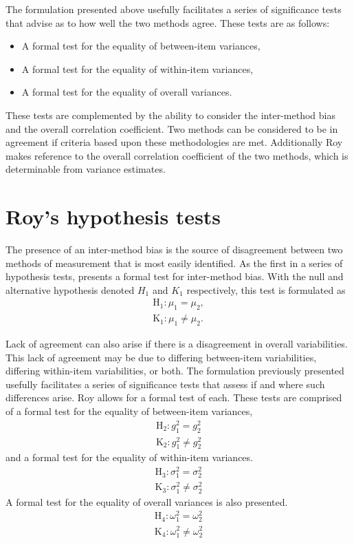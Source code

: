 \documentclass[12pt, a4paper]{report}
\theoremstyle{plain}
\theoremstyle{definition}
\theoremstyle{remark}
\begin{document}
	
The formulation presented above usefully facilitates a series of
significance tests that advise as to how well the two methods
agree. These tests are as follows:
\begin{itemize}
	\item A formal test for the equality of between-item variances,
	\item A formal test for the equality of within-item variances,
	\item A formal test for the equality of overall variances.
\end{itemize}
These tests are complemented by the ability to consider the inter-method bias and the overall correlation coefficient. Two methods can be considered to be in agreement if criteria based upon these methodologies are met. Additionally Roy makes reference to the overall correlation coefficient of the two methods, which is determinable from variance estimates.

\section{Roy's hypothesis tests}
The presence of an inter-method bias is the source of disagreement between two methods of measurement that is most easily identified. As the first in a series of hypothesis tests, \citet{roy} presents a formal test for inter-method bias. With the null and alternative hypothesis denoted $H_1$ and $K_1$ respectively, this test is formulated as
\begin{eqnarray*}
	\operatorname{H_1} : \mu_1 = \mu_2 ,\\
	\operatorname{K_1} : \mu_1 \neq \mu_2.
\end{eqnarray*}

Lack of agreement can also arise if there is a disagreement in overall variabilities. This lack of agreement may be due to differing between-item variabilities, differing within-item variabilities, or both. The formulation previously presented usefully facilitates a series of significance tests that assess if and where such differences arise. Roy allows for a formal test of each. These tests are comprised of a formal test for the equality of between-item variances,
\begin{eqnarray*}
	\operatorname{H_2} : g^2_1 = g^2_2 \\
	\operatorname{K_2} : g^2_1 \neq g^2_2
\end{eqnarray*}
and a formal test for the equality of within-item variances.
\begin{eqnarray*}
	\operatorname{H_3} : \sigma^2_1 = \sigma^2_2 \\
	\operatorname{K_3} : \sigma^2_1 \neq \sigma^2_2
\end{eqnarray*}
A formal test for the equality of overall variances is also presented.
\begin{eqnarray*}
	\operatorname{H_4} : \omega^2_1 = \omega^2_2 \\
	\operatorname{K_4} : \omega^2_1 \neq \omega^2_2
\end{eqnarray*}
\end{document}
